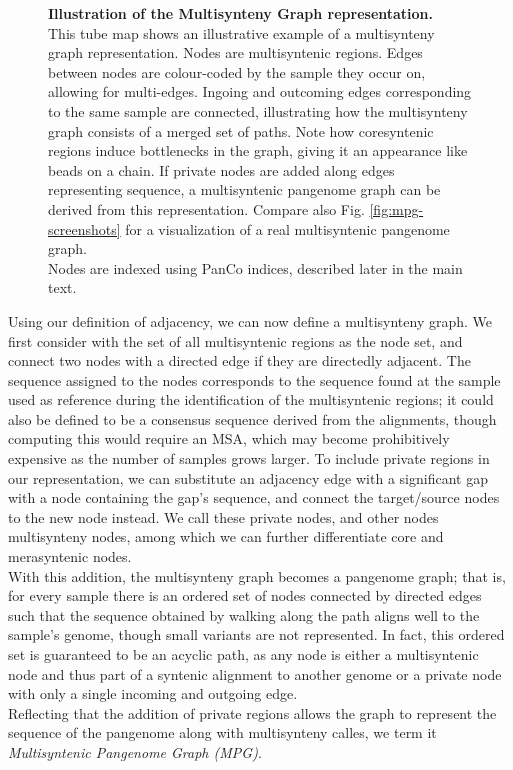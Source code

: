 \begin{figure}[t]
	\centering
	
	\caption{
		\textbf{Illustration of the Multisynteny Graph representation.}\\
		This tube map shows an illustrative example of a multisynteny graph representation.
		Nodes are multisyntenic regions.
		Edges between nodes are colour-coded by the sample they occur on, allowing for multi-edges.
		Ingoing and outcoming edges corresponding to the same sample are connected, illustrating how the multisynteny graph consists of a merged set of paths.
		Note how coresyntenic regions induce bottlenecks in the graph, giving it an appearance like beads on a chain.
		If private nodes are added along edges representing sequence, a multisyntenic pangenome graph can be derived from this representation.
		Compare also Fig. \ref{fig:mpg-screenshots} for a visualization of a real multisyntenic pangenome graph.\\
		Nodes are indexed using PanCo indices, described later in the main text.
	}
	\label{fig:mpg-concept}
\end{figure}

Using our definition of adjacency, we can now define a multisynteny graph.
We first consider with the set of all multisyntenic regions as the node set, and connect two nodes with a directed edge if they are directedly adjacent.
The sequence assigned to the nodes corresponds to the sequence found at the sample used as reference during the identification of the multisyntenic regions; it could also be defined to be a consensus sequence derived from the alignments, though computing this would require an MSA, which may become prohibitively expensive as the number of samples grows larger.
To include private regions in our representation, we can substitute an adjacency edge with a significant gap with a node containing the gap's sequence, and connect the target/source nodes to the new node instead. %
We call these private nodes, and other nodes multisynteny nodes, among which we can further differentiate core and merasyntenic nodes.\\
With this addition, the multisynteny graph becomes a pangenome graph; that is, for every sample there is an ordered set of nodes connected by directed edges such that the sequence obtained by walking along the path aligns well to the sample's genome, though small variants are not represented.
In fact, this ordered set is guaranteed to be an acyclic path, as any node is either a multisyntenic node and thus part of a syntenic alignment to another genome or a private node with only a single incoming and outgoing edge.\\%
Reflecting that the addition of private regions allows the graph to represent the sequence of the pangenome along with multisynteny calles, we term it \emph{Multisyntenic Pangenome Graph (MPG)}.


